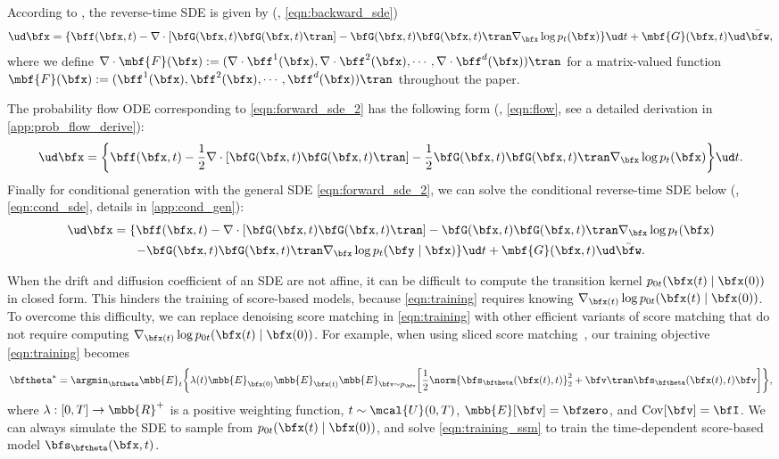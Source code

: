According to \citep{Anderson1982-ny}, the reverse-time SDE is given by (\cf, \cref{eqn:backward_sde})
\begin{align}
    \ud \bfx = \{\bff(\bfx, t) - \nabla \cdot [\bfG(\bfx, t) \bfG(\bfx,t)\tran] - \bfG(\bfx,t)\bfG(\bfx,t)\tran  \nabla_\bfx  \log p_t(\bfx)\} \ud t + \mbf{G}(\bfx, t) \ud \bar{\bfw},\label{eqn:backward_sde_2}
\end{align}
where we define $\nabla\cdot \mbf{F}(\bfx) := (\nabla \cdot \bff^1(\bfx), \nabla\cdot \bff^2(\bfx), \cdots, \nabla\cdot \bff^d(\bfx))\tran$ for a matrix-valued function $\mbf{F}(\bfx) := (\bff^1(\bfx), \bff^2(\bfx), \cdots, \bff^d(\bfx))\tran$ throughout the paper. 

The probability flow ODE corresponding to \cref{eqn:forward_sde_2} has the following form (\cf, \cref{eqn:flow}, see a detailed derivation in \cref{app:prob_flow_derive}):
\begin{align}
    \ud \bfx = \bigg\{\bff(\bfx, t) - \frac{1}{2} \nabla \cdot [\bfG(\bfx, t)\bfG(\bfx, t)\tran] - \frac{1}{2} \bfG(\bfx, t)\bfG(\bfx, t)\tran \nabla_\bfx \log p_t(\bfx)\bigg\} \ud t. \label{eqn:flow_2}
\end{align}
Finally for conditional generation with the general SDE \cref{eqn:forward_sde_2}, we can solve the conditional reverse-time SDE below (\cf, \cref{eqn:cond_sde}, details in \cref{app:cond_gen}):
\begin{multline}
\ud \bfx = \{\bff(\bfx, t) - \nabla \cdot [\bfG(\bfx, t) \bfG(\bfx,t)\tran] - \bfG(\bfx,t)\bfG(\bfx,t)\tran  \nabla_\bfx  \log p_t(\bfx)\\ - \bfG(\bfx,t)\bfG(\bfx,t)\tran  \nabla_{\bfx}  \log p_t(\bfy \mid \bfx)\} \ud t + \mbf{G}(\bfx, t) \ud \bar{\bfw}.\label{eqn:cond_sde_2}
\end{multline}

When the drift and diffusion coefficient of an SDE are not affine, it can be difficult to compute the transition kernel $p_{0t}(\bfx(t) \mid \bfx(0))$ in closed form. This hinders the training of score-based models, because \cref{eqn:training} requires knowing $\nabla_{\bfx(t)}\log p_{0t}(\bfx(t) \mid \bfx(0))$. To overcome this difficulty, we can replace denoising score matching in \cref{eqn:training} with other efficient variants of score matching that do not require computing $\nabla_{\bfx(t)}\log p_{0t}(\bfx(t) \mid \bfx(0))$. For example, when using sliced score matching~\citep{song2019sliced}, our training objective \cref{eqn:training} becomes
\begin{align}
   \bftheta^* = \argmin_\bftheta 
   \mbb{E}_{t}\bigg\{\lambda(t) \mbb{E}_{\bfx(0)}\mbb{E}_{\bfx(t) }\mbb{E}_{\bfv \sim p_\bfv}
   \bigg[\frac{1}{2}\norm{\bfs_\bftheta(\bfx(t), t)}_2^2 + \bfv\tran \bfs_\bftheta(\bfx(t), t) \bfv \bigg]\bigg\}%
   , \label{eqn:training_ssm}
\end{align}
where $\lambda: [0,T] \to \mbb{R}^+$ is a positive weighting function, $t \sim \mcal{U}(0, T)$, $\mbb{E}[\bfv] = \bfzero$, and $\operatorname{Cov}[\bfv] = \bfI$. We can always simulate the SDE to sample from $p_{0t}(\bfx(t) \mid \bfx(0))$, and solve \cref{eqn:training_ssm} to train the time-dependent score-based model $\bfs_\bftheta(\bfx, t)$.




